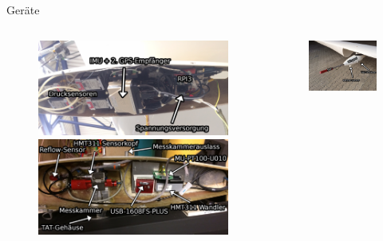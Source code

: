 \documentclass[ucs,9pt]{beamer}
\begin{document}
\begin{frame}{Geräte}
	\begin{columns}
		\begin{column}{.45\textwidth}
			\begin{figure}
				\includegraphics[width=\textwidth]{./docmedia/wingpod_oberseite.jpg}
				\qquad
				\includegraphics[width=\textwidth]{./docmedia/wingpod_unterseite.jpg}
			\end{figure}
		\end{column}
		\begin{column}{.45\textwidth}
			\begin{figure}
				\includegraphics[width=\textwidth]{./docmedia/wingpod_whole.jpg}
			\end{figure}
		\end{column}
	\end{columns}
\end{frame}
\end{document}
